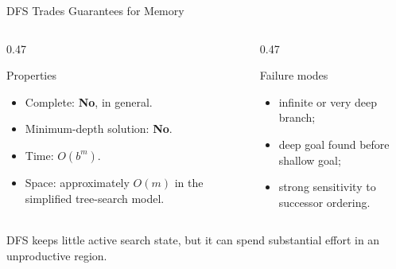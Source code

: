 \documentclass[aspectratio=169,10pt]{beamer}
\begin{document}
\begin{frame}[shrink=20]{DFS Trades Guarantees for Memory}
  \begin{columns}[T,onlytextwidth]
    \begin{column}{0.47\textwidth}
      \begin{block}{Properties}
        \begin{itemize}
          \item Complete: \textbf{No}, in general.
          \item Minimum-depth solution: \textbf{No}.
          \item Time: $O(b^m)$.
          \item Space: approximately $O(m)$ in the simplified tree-search model.
        \end{itemize}
      \end{block}
    \end{column}

    \begin{column}{0.47\textwidth}
      \begin{block}{Failure modes}
        \begin{itemize}
          \item infinite or very deep branch;
          \item deep goal found before shallow goal;
          \item strong sensitivity to successor ordering.
        \end{itemize}
      \end{block}
    \end{column}
  \end{columns}

  \begin{keyidea}
    DFS keeps little active search state, but it can spend substantial effort in an unproductive region.
  \end{keyidea}
\end{frame}
\end{document}
